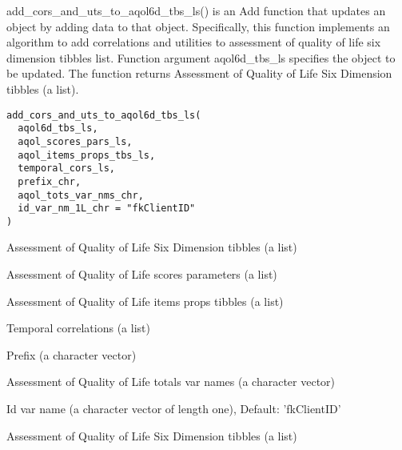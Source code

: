 \documentclass[a4paper]{book}
\begin{document}
%
\begin{Description}\relax
add\_cors\_and\_uts\_to\_aqol6d\_tbs\_ls() is an Add function that updates an object by adding data to that object. Specifically, this function implements an algorithm to add correlations and utilities to assessment of quality of life six dimension tibbles list. Function argument aqol6d\_tbs\_ls specifies the object to be updated. The function returns Assessment of Quality of Life Six Dimension tibbles (a list).
\end{Description}
%
\begin{Usage}
\begin{verbatim}
add_cors_and_uts_to_aqol6d_tbs_ls(
  aqol6d_tbs_ls,
  aqol_scores_pars_ls,
  aqol_items_props_tbs_ls,
  temporal_cors_ls,
  prefix_chr,
  aqol_tots_var_nms_chr,
  id_var_nm_1L_chr = "fkClientID"
)
\end{verbatim}
\end{Usage}
%
\begin{Arguments}
\begin{ldescription}
\item[\code{aqol6d\_tbs\_ls}] Assessment of Quality of Life Six Dimension tibbles (a list)

\item[\code{aqol\_scores\_pars\_ls}] Assessment of Quality of Life scores parameters (a list)

\item[\code{aqol\_items\_props\_tbs\_ls}] Assessment of Quality of Life items props tibbles (a list)

\item[\code{temporal\_cors\_ls}] Temporal correlations (a list)

\item[\code{prefix\_chr}] Prefix (a character vector)

\item[\code{aqol\_tots\_var\_nms\_chr}] Assessment of Quality of Life totals var names (a character vector)

\item[\code{id\_var\_nm\_1L\_chr}] Id var name (a character vector of length one), Default: 'fkClientID'
\end{ldescription}
\end{Arguments}
%
\begin{Value}
Assessment of Quality of Life Six Dimension tibbles (a list)
\end{Value}
\end{document}
